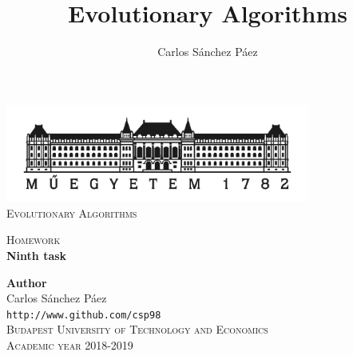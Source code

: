 \documentclass[12pt,english]{article}
\title{Evolutionary Algorithms}
\author{Carlos Sánchez Páez}
\begin{document}
\begin{titlepage}

\newlength{\centeroffset}
\setlength{\centeroffset}{-0.5\oddsidemargin}
\addtolength{\centeroffset}{0.5\evensidemargin}
\thispagestyle{empty}

\noindent\hspace*{\centeroffset}
\begin{minipage}{\textwidth}

\centering
\includegraphics[width=0.75\textwidth]{bme_logo.jpg}\\[1.4cm]

\textsc{ \Large Evolutionary Algorithms\\[4cm]}

\textsc{\Huge Homework}\\[0.75cm]

{\Large\bfseries Ninth task\\}
\end{minipage}

\vspace{8cm}
\noindent\hspace*{\centeroffset}
\begin{minipage}{\textwidth}
\centering

\textbf{Author}\\ {Carlos Sánchez Páez}\\
\texttt{http://www.github.com/csp98}\\[0.5cm]
\textsc{Budapest University of Technology and Economics}\\
\vspace{1cm}
\textsc{Academic year 2018-2019}
\end{minipage}
\end{titlepage}
\thispagestyle{empty}

\newpage
\end{document}
